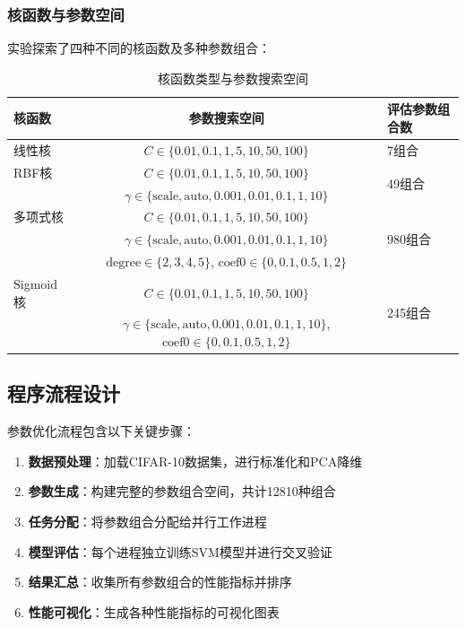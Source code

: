 \documentclass[UTF8]{report}
\theoremstyle{MyLineTheoremStyle} %
\theoremstyle{MyBlockTheoremStyle} %
\theoremstyle{MySubsubsectionStyle} %
\begin{document}
\subsubsection{核函数与参数空间}
实验探索了四种不同的核函数及多种参数组合：

\begin{table}[h]
\centering
\caption{核函数类型与参数搜索空间}
\begin{tabular}{l c l}
\toprule
\textbf{核函数} & \textbf{参数搜索空间} & \textbf{评估参数组合数} \\
\midrule
线性核 & $C \in \{0.01, 0.1, 1, 5, 10, 50, 100\}$ & 7组合 \\
RBF核 & $C \in \{0.01, 0.1, 1, 5, 10, 50, 100\}$ & \multirow{2}{*}{49组合} \\
 & $\gamma \in \{\text{scale}, \text{auto}, 0.001, 0.01, 0.1, 1, 10\}$ & \\
多项式核 & $C \in \{0.01, 0.1, 1, 5, 10, 50, 100\}$ & \multirow{3}{*}{980组合} \\
 & $\gamma \in \{\text{scale}, \text{auto}, 0.001, 0.01, 0.1, 1, 10\}$ & \\
 & $\text{degree} \in \{2, 3, 4, 5\}$, $\text{coef0} \in \{0, 0.1, 0.5, 1, 2\}$ & \\
Sigmoid核 & $C \in \{0.01, 0.1, 1, 5, 10, 50, 100\}$ & \multirow{2}{*}{245组合} \\
 & $\gamma \in \{\text{scale}, \text{auto}, 0.001, 0.01, 0.1, 1, 10\}$, $\text{coef0} \in \{0, 0.1, 0.5, 1, 2\}$ & \\
\bottomrule
\end{tabular}
\end{table}
\subsection{程序流程设计}
参数优化流程包含以下关键步骤：

\begin{enumerate}[label=\arabic*.]
    \item \textbf{数据预处理}：加载CIFAR-10数据集，进行标准化和PCA降维
    \item \textbf{参数生成}：构建完整的参数组合空间，共计12810种组合
    \item \textbf{任务分配}：将参数组合分配给并行工作进程
    \item \textbf{模型评估}：每个进程独立训练SVM模型并进行交叉验证
    \item \textbf{结果汇总}：收集所有参数组合的性能指标并排序
    \item \textbf{性能可视化}：生成各种性能指标的可视化图表
\end{enumerate}
\end{document}
